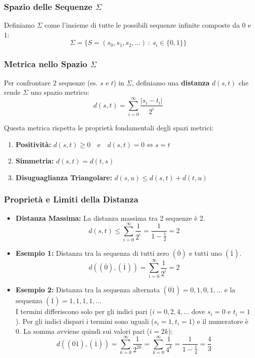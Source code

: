 \documentclass[openany]{book}
\theoremstyle{definition}
\theoremstyle{remark}
\begin{document}
\subsubsection*{Spazio delle Sequenze $\Sigma$}

Definiamo $\Sigma$ come l'insieme di tutte le possibili sequenze infinite composte da 0 e 1:
$$ \Sigma = \{ S = (s_0, s_1, s_2, \dots) \ : \ s_i \in \{0, 1\} \} $$

\subsubsection*{Metrica nello Spazio $\Sigma$}

Per confrontare 2 sequenze (es. $s$ e $t$) in $\Sigma$, definiamo una \textbf{distanza} $d(s,t)$ che rende $\Sigma$ uno spazio metrico:
$$ d(s, t) = \sum_{i=0}^{\infty} \frac{|s_i - t_i|}{2^i} $$

Questa metrica rispetta le proprietà fondamentali degli spazi metrici:
\begin{enumerate}
    \item \textbf{Positività:} $d(s,t) \geq 0 \quad \text{e} \quad d(s,t) = 0 \iff s = t$
    \item \textbf{Simmetria:} $d(s,t) = d(t,s)$
    \item \textbf{Disuguaglianza Triangolare:} $d(s,u) \leq d(s,t) + d(t,u)$
\end{enumerate}


\subsubsection*{Proprietà e Limiti della Distanza}

\begin{itemize}
    \item \textbf{Distanza Massima:} La distanza massima tra 2 sequenze è 2.
    $$ d(s, t) \leq \sum_{i=0}^{\infty} \frac{1}{2^i} = \frac{1}{1 - \frac{1}{2}} = 2 $$
    
    \item \textbf{Esempio 1:} Distanza tra la sequenza di tutti zero $(\overline{0})$ e tutti uno $(\overline{1})$.
    $$ d((\overline{0}), (\overline{1})) = \sum_{i=0}^{\infty} \frac{1}{2^i} = 2 $$
    
    \item \textbf{Esempio 2:} Distanza tra la sequenza alternata $(\overline{01}) = 0, 1, 0, 1, \dots$ e la sequenza $(\overline{1}) = 1, 1, 1, 1, \dots$ \\
    I termini differiscono solo per gli indici pari ($i = 0, 2, 4, \dots$ dove $s_i=0$ e $t_i=1$). Per gli indici dispari i termini sono uguali ($s_i=1, t_i=1$) e il numeratore è $0$. La somma avviene quindi sui valori pari ($i = 2k$):
    $$ d((\overline{01}), (\overline{1})) = \sum_{k=0}^{\infty} \frac{1}{2^{2k}} = \sum_{k=0}^{\infty} \frac{1}{4^k} = \frac{1}{1 - \frac{1}{4}} = \frac{4}{3} $$
\end{itemize}
\end{document}
